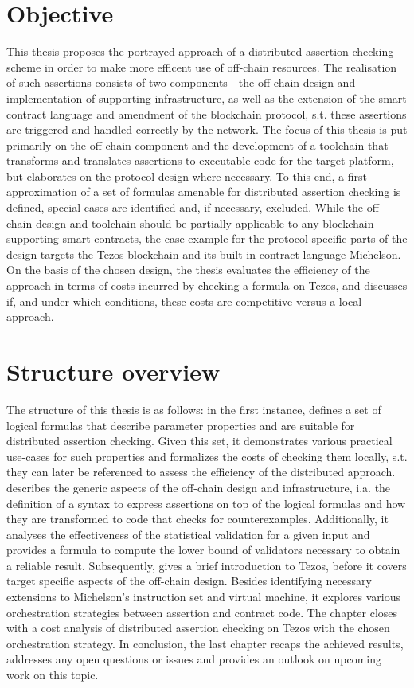 \section{Objective}
This thesis proposes the portrayed approach of a distributed assertion checking scheme in order to make more efficent use of off-chain resources. The realisation of such assertions consists of two components - the off-chain design and implementation of supporting infrastructure, as well as the extension of the smart contract language and amendment of the blockchain protocol, s.t. these assertions are triggered and handled correctly by the network. The focus of this thesis is put primarily on the off-chain component and the development of a toolchain that transforms and translates assertions to executable code for the target platform, but elaborates on the protocol design where necessary. To this end, a first approximation of a set of formulas amenable for distributed assertion checking is defined, special cases are identified and, if necessary, excluded. While the off-chain design and toolchain should be partially applicable to any blockchain supporting smart contracts, the case example for the protocol-specific parts of the design targets the Tezos blockchain and its built-in contract language Michelson. On the basis of the chosen design, the thesis evaluates the efficiency of the approach in terms of costs incurred by checking a formula on Tezos, and discusses if, and under which conditions, these costs are competitive versus a local approach.

\section{Structure overview}
The structure of this thesis is as follows: in the first instance,  defines a set of logical formulas that describe parameter properties and are suitable for distributed assertion checking. Given this set, it demonstrates various practical use-cases for such properties and formalizes the costs of checking them locally, s.t. they can later be referenced to assess the efficiency of the distributed approach.  describes the generic aspects of the off-chain design and infrastructure, i.a. the definition of a syntax to express assertions on top of the logical formulas and how they are transformed to code that checks for counterexamples. Additionally, it analyses the effectiveness of the statistical validation for a given input and provides a formula to compute the lower bound of validators necessary to obtain a reliable result. Subsequently,  gives a brief introduction to Tezos, before it covers target specific aspects of the off-chain design. Besides identifying necessary extensions to Michelson's instruction set and virtual machine, it explores various orchestration strategies between assertion and contract code. The chapter closes with a cost analysis of distributed assertion checking on Tezos with the chosen orchestration strategy. In conclusion, the last chapter recaps the achieved results, 
addresses any open questions or issues and provides an outlook on upcoming work on this topic.